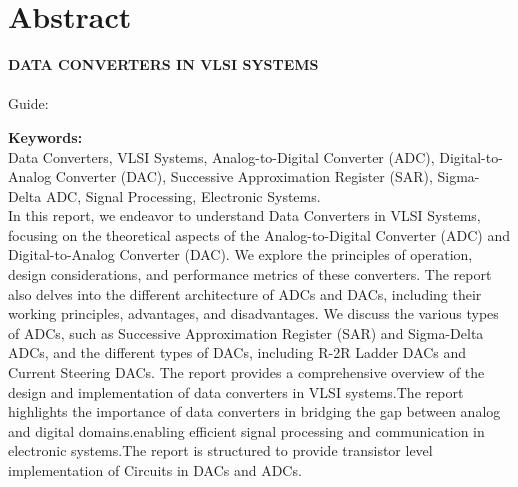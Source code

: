 \chapter*{Abstract}

\addborder
\begin{center}
	\vspace{5mm}
	\MakeUppercase{\textbf{DATA CONVERTERS IN VLSI SYSTEMS}}\\
	\vspace{5mm}
	\memberA \\
	\vspace{5mm}
	Guide: \guideA \\
	\vspace{5mm}
\end{center}

\noindent \textbf{Keywords:}\\
Data Converters, VLSI Systems, Analog-to-Digital Converter (ADC), Digital-to-Analog Converter (DAC), Successive Approximation Register (SAR), Sigma-Delta ADC, Signal Processing, Electronic Systems.
\\

In this report, we endeavor to understand Data Converters in VLSI Systems, 
focusing on the theoretical aspects of the Analog-to-Digital Converter (ADC) and Digital-to-Analog Converter (DAC).
We explore the principles of operation, design considerations, and performance metrics of these converters.
The report also delves into the different architecture of ADCs and DACs,
including their working principles, advantages, and disadvantages.
We discuss the various types of ADCs, such as Successive Approximation Register (SAR)
and Sigma-Delta ADCs, and the different types of DACs, including R-2R Ladder DACs and Current Steering DACs.
The report provides a comprehensive overview of the design and implementation of data converters in VLSI systems.The report highlights the importance of data converters in bridging the gap between analog and digital domains.enabling efficient signal processing and communication in electronic systems.The report is structured to provide transistor level implementation of Circuits in DACs and ADCs.
